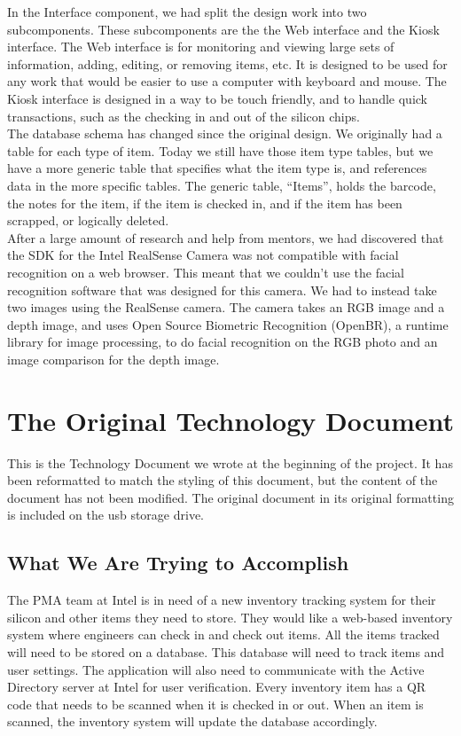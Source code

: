 \documentclass[10pt, onecolumn, twoside, peerreview]{IEEEtran}
\begin{document}
In the Interface component, we had split the design work into two subcomponents. These subcomponents are the the Web interface and the Kiosk interface. The Web interface is for monitoring and viewing large sets of information, adding, editing, or removing items, etc. It is designed to be used for any work that would be easier to use a computer with keyboard and mouse. The Kiosk interface is designed in a way to be touch friendly, and to handle quick transactions, such as the checking in and out of the silicon chips.\\

The database schema has changed since the original design. We originally had a table for each type of item. Today we still have those item type tables, but we have a more generic table that specifies what the item type is, and references data in the more specific tables. The generic table, “Items”, holds the barcode, the notes for the item, if the item is checked in, and if the item has been scrapped, or logically deleted.\\

After a large amount of research and help from mentors, we had discovered that the SDK for the Intel RealSense Camera was not compatible with facial recognition on a web browser. This meant that we couldn’t use the facial recognition software that was designed for this camera. We had to instead take two images using the RealSense camera. The camera takes an RGB image and a depth image, and uses Open Source Biometric Recognition (OpenBR), a runtime library for image processing, to do facial recognition on the RGB photo and an image comparison for the depth image.\\

\section{The Original Technology Document}
This is the Technology Document we wrote at the beginning of the project. It has been reformatted to match the styling
of this document, but the content of the document has not been modified. The original document in its original
formatting is included on the usb storage drive.

\subsection{What We Are Trying to Accomplish}
The PMA team at Intel is in need of a new inventory tracking system for their silicon and other items they need to
store. They would like a web-based inventory system where engineers can check in and check out items. All the items
tracked will need to be stored on a database. This database will need to track items and user settings. The application
will also need to communicate with the Active Directory server at Intel for user verification. Every inventory item has
a QR code that needs to be scanned when it is checked in or out. When an item is scanned, the inventory system will
update the database accordingly.
\end{document}
